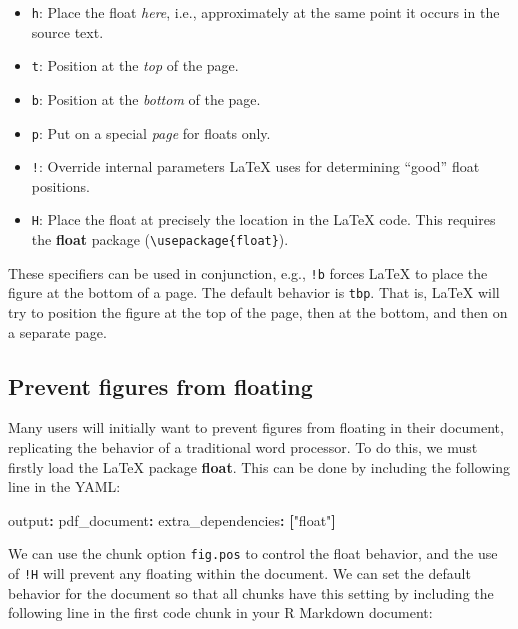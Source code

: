 \documentclass[
  11pt,
]{krantz}
\newenvironment{Shaded}{\begin{snugshade}}{\end{snugshade}}
\newcommand{\AttributeTok}[1]{\textcolor[rgb]{0.61,0.61,0.61}{#1}}
\newcommand{\FunctionTok}[1]{\textcolor[rgb]{0,0,0}{#1}}
\newcommand{\KeywordTok}[1]{\textcolor[rgb]{0.27,0.27,0.27}{\textbf{#1}}}
\newcommand{\StringTok}[1]{\textcolor[rgb]{0.5,0.5,0.5}{#1}}
\providecommand{\tightlist}{%
  \setlength{\itemsep}{0pt}\setlength{\parskip}{0pt}}
\begin{document}
\begin{itemize}
\tightlist
\item
  \texttt{h}: Place the float \emph{here}, i.e., approximately at the same point it occurs in the source text.
\item
  \texttt{t}: Position at the \emph{top} of the page.
\item
  \texttt{b}: Position at the \emph{bottom} of the page.
\item
  \texttt{p}: Put on a special \emph{page} for floats only.
\item
  \texttt{!}: Override internal parameters LaTeX uses for determining ``good'' float positions.
\item
  \texttt{H}: Place the float at precisely the location in the LaTeX code. This requires the \textbf{float} package (\texttt{\textbackslash{}usepackage\{float\}}).
\end{itemize}

These specifiers can be used in conjunction, e.g., \texttt{!b} forces LaTeX to place the figure at the bottom of a page. The default behavior is \texttt{tbp}. That is, LaTeX will try to position the figure at the top of the page, then at the bottom, and then on a separate page.

\hypertarget{prevent-figures-from-floating}{%
\subsection{Prevent figures from floating}\label{prevent-figures-from-floating}}

Many users will initially want to prevent figures from floating in their document, replicating the behavior of a traditional word processor. To do this, we must firstly load the LaTeX package \textbf{float}. This can be done by including the following line in the YAML:

\begin{Shaded}
\begin{Highlighting}[]
\FunctionTok{output}\KeywordTok{:}\AttributeTok{ }
\AttributeTok{  }\FunctionTok{pdf_document}\KeywordTok{:}
\AttributeTok{    }\FunctionTok{extra_dependencies}\KeywordTok{:}\AttributeTok{ }\KeywordTok{[}\StringTok{"float"}\KeywordTok{]}
\end{Highlighting}
\end{Shaded}

We can use the chunk option \texttt{fig.pos} to control the float behavior, and the use of \texttt{!H} will prevent any floating within the document. We can set the default behavior for the document so that all chunks have this setting by including the following line in the first code chunk in your R Markdown document:
\end{document}
